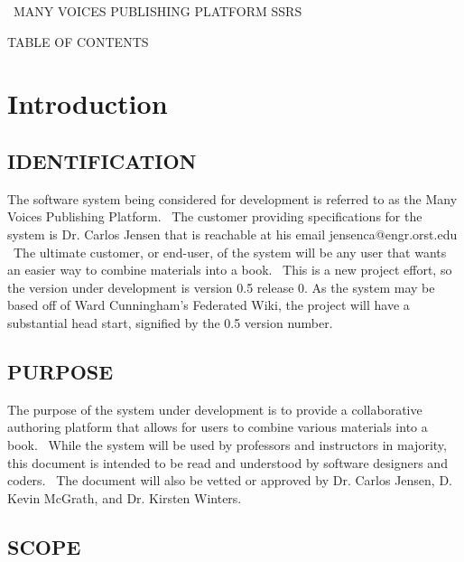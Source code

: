 \documentclass[letterpaper, 10pt, draftclsnofoot, compsoc, onecolumn]{IEEEtran}
\begin{document}
\clearpage
{\centering
{\MakeUppercase{\ }}{\MakeUppercase{Many Voices Publishing Platform SSRS}}
\par}

{\centering
TABLE OF CONTENTS
\par}

\setcounter{tocdepth}{9}
\tableofcontents


\clearpage

\setcounter{page}{1}\pagestyle{fancy}
\section[Introduction]{\rmfamily\bfseries\color{black} Introduction}

\subsection[IDENTIFICATION]{\rmfamily\bfseries\color{black} IDENTIFICATION}


{\noindent
The software system being considered for development is referred to as the Many Voices
Publishing Platform. \ The customer providing specifications
for the system is Dr. Carlos Jensen that is reachable at his email jensenca@engr.orst.edu \
The ultimate customer, or end-user, of the system will be any user that wants an easier
way to combine materials into a book. \ This is a new project effort, so the
version under development is version 0.5 release 0. As the system may be based off of Ward Cunningham's 
Federated Wiki, the project will have a substantial head start, signified by the 0.5 version number.}

\subsection[PURPOSE]{\rmfamily\bfseries\color{black} PURPOSE}

{\noindent 
The purpose of the system under
development is to provide a collaborative authoring platform that allows for users to
combine various materials into a book. \ While the system will be used by professors and
instructors in majority, this document is intended to be read and understood by software
designers and coders. \ The document will also be vetted or
approved by Dr. Carlos Jensen, D. Kevin McGrath, and Dr. Kirsten Winters.}

\subsection[SCOPE]{\rmfamily\bfseries\color{black} SCOPE}
\end{document}
